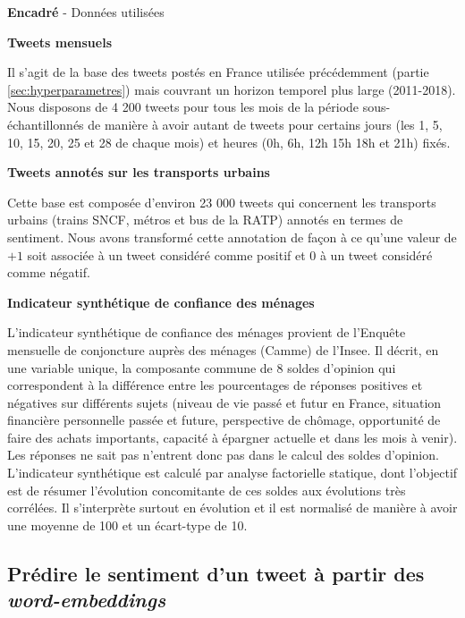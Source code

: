 \documentclass[11pt,french,french]{article}
\newcounter{comptEncadre}
\renewcommand\thecomptEncadre{%
\arabic{comptEncadre}}
\newenvironment{encadre}[2][false]{\refstepcounter{comptEncadre}
\begin{bclogo}[couleur=processblue!5,arrondi=0.1,
logo=\bcloupe,barre=none,couleurBord=blue!60!green,nobreak = #1]{ {\sc \textbf{Encadré \thecomptEncadre}} -  #2}
\smallskip
}{\end{bclogo}}
\begin{document}
\begin{encadre}[true]{Données utilisées}\label{enc:encadre1}

\small

\textbf{Tweets mensuels}

Il s'agit de la base des tweets postés en France utilisée précédemment (partie  \ref{sec:hyperparametres}) mais couvrant un horizon temporel plus large (2011-2018).
Nous disposons de 4 200 tweets pour tous les mois de la période sous-échantillonnés de manière à avoir autant de tweets pour certains jours (les 1, 5, 10, 15, 20, 25 et 28 de chaque mois) et heures (0h, 6h, 12h 15h 18h et 21h) fixés. 

\textbf{Tweets annotés sur les transports urbains}

Cette base est composée d'environ 23 000 tweets qui concernent les transports urbains (trains SNCF, métros et bus de la RATP) annotés en termes de sentiment.
Nous avons transformé cette annotation de façon à ce qu'une valeur de $+1$ soit associée à un tweet considéré comme positif et $0$ à un tweet considéré comme négatif.


\textbf{Indicateur synthétique de confiance des ménages}

L’indicateur synthétique de confiance des ménages provient de l'Enquête mensuelle de conjoncture auprès des ménages (Camme) de l’Insee.
Il décrit, en une variable unique, la composante commune de 8 soldes d’opinion qui correspondent à la différence entre les pourcentages de réponses positives et négatives sur différents sujets (niveau de vie passé et futur en France, situation financière personnelle passée et future, perspective de chômage, opportunité de faire des achats importants, capacité à épargner actuelle et dans les mois à venir). Les réponses \og ne sait pas \fg n'entrent donc pas dans le calcul des soldes d'opinion.
L'indicateur synthétique est calculé par analyse factorielle statique, dont l’objectif est de résumer l’évolution concomitante de ces soldes aux évolutions très corrélées.
Il s’interprète surtout en évolution et il est normalisé de manière à avoir une moyenne de 100 et un écart-type de 10. 

\end{encadre}

\subsection{\texorpdfstring{Prédire le sentiment d'un tweet à partir des
\emph{word-embeddings}}{Prédire le sentiment d'un tweet à partir des word-embeddings}}\label{pruxe9dire-le-sentiment-dun-tweet-uxe0-partir-des-word-embeddings}
\end{document}
